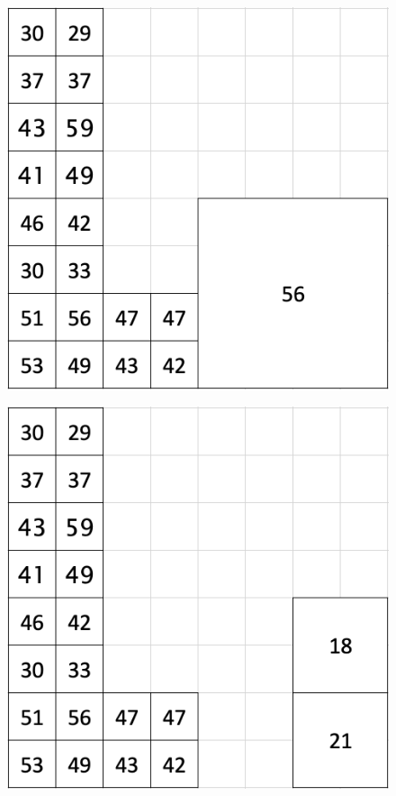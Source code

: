 \begin{figure}[ht!]
\begin{minipage}[b]{0.22\linewidth}
    \subcaption{}
    \label{fig:Fig3b}
  \end{minipage}
  \begin{minipage}[b]{0.22\linewidth}
    \includegraphics[width=\linewidth]{images/Fig3c.png}
    \subcaption{}
    \label{fig:Fig3c}
  \end{minipage}
  \begin{minipage}[b]{0.22\linewidth}
    \includegraphics[width=\linewidth]{images/Fig3d.png}

\end{minipage}
\end{figure}

